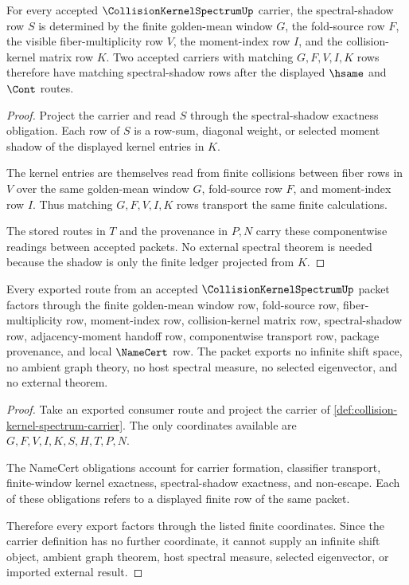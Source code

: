 \begin{theorem}
\label{thm:collision-kernel-spectrum-finite-window-spectral-shadow}
For every accepted $\CollisionKernelSpectrumUp$ carrier, the spectral-shadow row $S$ is determined by the finite golden-mean window $G$, the fold-source row $F$, the visible fiber-multiplicity row $V$, the moment-index row $I$, and the collision-kernel matrix row $K$. Two accepted carriers with matching $G,F,V,I,K$ rows therefore have matching spectral-shadow rows after the displayed $\hsame$ and $\Cont$ routes.
\end{theorem}
\begin{proof}
Project the carrier and read $S$ through the spectral-shadow exactness obligation. Each row of $S$ is a row-sum, diagonal weight, or selected moment shadow of the displayed kernel entries in $K$.

The kernel entries are themselves read from finite collisions between fiber rows in $V$ over the same golden-mean window $G$, fold-source row $F$, and moment-index row $I$. Thus matching $G,F,V,I,K$ rows transport the same finite calculations.

The stored routes in $T$ and the provenance in $P,N$ carry these componentwise readings between accepted packets. No external spectral theorem is needed because the shadow is only the finite ledger projected from $K$.
\end{proof}

\begin{theorem}
\label{thm:collision-kernel-spectrum-ledger-non-escape}
Every exported route from an accepted $\CollisionKernelSpectrumUp$ packet factors through the finite golden-mean window row, fold-source row, fiber-multiplicity row, moment-index row, collision-kernel matrix row, spectral-shadow row, adjacency-moment handoff row, componentwise transport row, package provenance, and local $\NameCert$ row. The packet exports no infinite shift space, no ambient graph theory, no host spectral measure, no selected eigenvector, and no external theorem.
\end{theorem}
\begin{proof}
Take an exported consumer route and project the carrier of \autoref{def:collision-kernel-spectrum-carrier}. The only coordinates available are $G,F,V,I,K,S,H,T,P,N$.

The NameCert obligations account for carrier formation, classifier transport, finite-window kernel exactness, spectral-shadow exactness, and non-escape. Each of these obligations refers to a displayed finite row of the same packet.

Therefore every export factors through the listed finite coordinates. Since the carrier definition has no further coordinate, it cannot supply an infinite shift object, ambient graph theorem, host spectral measure, selected eigenvector, or imported external result.
\end{proof}

